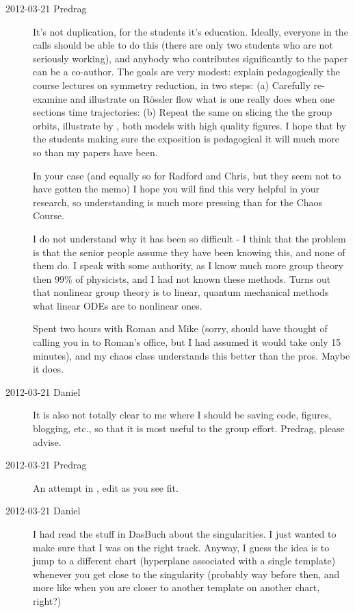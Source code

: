 \begin{description}
\item[2012-03-21 Predrag]
It's not duplication, for the students it's education. Ideally, everyone
in the calls should be able to do this (there are only two students who
are not seriously working), and anybody who contributes significantly to
the paper can be a co-author. The goals are very modest: explain
pedagogically the course lectures on symmetry reduction, in two steps:
(a) Carefully re-examine and illustrate on R\"ossler flow what is one
really does when one sections time trajectories: (b) Repeat the same on
slicing the the group orbits, illustrate by \cLf, both models with high
quality figures. I hope that by the students making sure the exposition
is pedagogical it will much more so than my papers have been.

In your case (and equally so for Radford and Chris, but they seem not to
have gotten the memo) I hope you will find this very helpful in your
research, so understanding is much more pressing than for the Chaos
Course.

I do not understand why it has been so difficult - I think that the
problem is that the senior people assume they have been knowing this, and
none of them do. I speak with some authority, as I know much more group
theory then 99\% of physicists, and I had not known these methods. Turns out
that nonlinear group theory is to linear, quantum mechanical methods what
linear ODEs are to nonlinear ones.

Spent two hours with Roman and Mike (sorry, should have thought of
calling you in to Roman's office, but I had assumed it would take only 15
minutes), and my chaos class understands this better than the pros. Maybe
it does.

\item[2012-03-21 Daniel]
It is also not totally clear to me where I should be saving code,
figures, blogging, etc., so that it is most useful to the group effort.
Predrag, please advise.

\item[2012-03-21 Predrag]
An attempt in , edit as you see fit.

\item[2012-03-21 Daniel]
I had read the stuff in DasBuch about the singularities. I just wanted to
make sure that I was on the right track. Anyway, I guess the idea is to
jump to a different chart (hyperplane associated with a single template)
whenever you get close to the singularity (probably way before then, and
more like when you are closer to another template on another chart,
right?)


\end{description}
